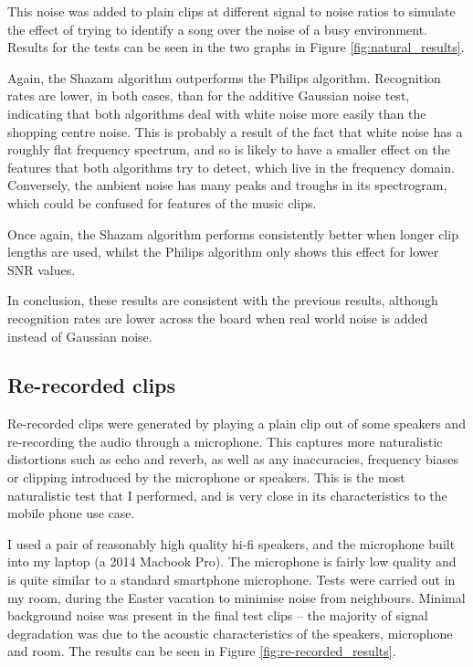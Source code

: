 \documentclass[12pt,a4paper,twoside,openright]{report}
\begin{document}
This noise was added to plain clips at different signal to noise ratios to simulate the effect of trying to identify a song over the noise of a busy environment. Results for the tests can be seen in the two graphs in Figure \ref{fig:natural_results}.

Again, the Shazam algorithm outperforms the Philips algorithm. Recognition rates are lower, in both cases, than for the additive Gaussian noise test, indicating that both algorithms deal with white noise more easily than the shopping centre noise. This is probably a result of the fact that white noise has a roughly flat frequency spectrum, and so is likely to have a smaller effect on the features that both algorithms try to detect, which live in the frequency domain. Conversely, the ambient noise has many peaks and troughs in its spectrogram, which could be confused for features of the music clips.

Once again, the Shazam algorithm performs consistently better when longer clip lengths are used, whilst the Philips algorithm only shows this effect for lower SNR values.

In conclusion, these results are consistent with the previous results, although recognition rates are lower across the board when real world noise is added instead of Gaussian noise.


\subsection{Re-recorded clips}

Re-recorded clips were generated by playing a plain clip out of some speakers and re-recording the audio through a microphone. This captures more naturalistic distortions such as echo and reverb, as well as any inaccuracies, frequency biases or clipping introduced by the microphone or speakers. This is the most naturalistic test that I performed, and is very close in its characteristics to the mobile phone use case.

I used a pair of reasonably high quality hi-fi speakers, and the microphone built into my laptop (a 2014 Macbook Pro). The microphone is fairly low quality and is quite similar to a standard smartphone microphone. Tests were carried out in my room, during the Easter vacation to minimise noise from neighbours. Minimal background noise was present in the final test clips -- the majority of signal degradation was due to the acoustic characteristics of the speakers, microphone and room. The results can be seen in Figure \ref{fig:re-recorded_results}. 
\end{document}

